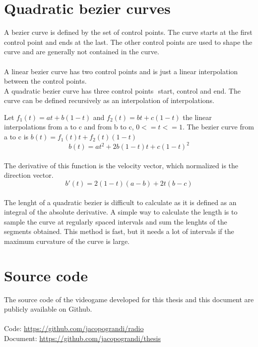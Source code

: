 \documentclass[12pt]{article}
\begin{document}
\begin{appendices}
\section{Quadratic bezier curves}
A bezier curve is defined by the set of control points. The curve starts at the first control point and ends at the last. The other control points are used to shape the curve and are generally not contained in the curve. \\
\\
A linear bezier curve has two control points and is just a linear interpolation between the control points. \\
A quadratic bezier curve has three control points \begin{math}[ a, b, c ]\end{math} start, control and end. The curve can be defined recursively as an interpolation of interpolations. 
 
\medskip

Let \begin{math}f_1(t) = at + b(1-t)\end{math} and \begin{math}f_2(t) = bt + c(1-t)\end{math} the linear interpolations from a to c and from b to c, \begin{math}0 <= t <= 1\end{math}.
The bezier curve from a to c is \begin{math}b(t) = f_1(t)t + f_2(t)(1-t)\end{math} \\
\begin{equation}b(t) = at^2 + 2b(1-t)t + c(1-t)^2\end{equation}
\\
The derivative of this function is the velocity vector, which normalized is the direction vector.
\begin{equation}b'(t) = 2(1-t)(a-b) + 2t(b-c)\end{equation}
\\
The lenght of a quadratic bezier is difficult to calculate as it is defined as an integral of the absolute derivative. A simple way to calculate the length is to sample the curve at regularly spaced intervals and sum the lenghts of the segments obtained. This method is fast, but it needs a lot of intervals if the maximum curvature of the curve is large.

\clearpage

\section{Source code}
The source code of the videogame developed for this thesis and this document are publicly available on Github. \\
\\
Code: \url{https://github.com/jacopograndi/radio} \\
Document: \url{https://github.com/jacopograndi/thesis} \\

\end{appendices}

\clearpage



\end{document}
